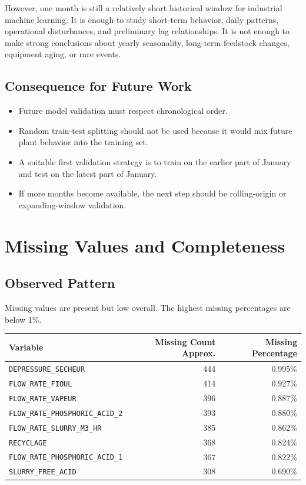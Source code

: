 \documentclass[11pt,a4paper]{article}
\begin{document}
However, one month is still a relatively short historical window for industrial machine learning. It is enough to study short-term behavior, daily patterns, operational disturbances, and preliminary lag relationships. It is not enough to make strong conclusions about yearly seasonality, long-term feedstock changes, equipment aging, or rare events.

\subsection{Consequence for Future Work}

\begin{itemize}
    \item Future model validation must respect chronological order.
    \item Random train-test splitting should not be used because it would mix future plant behavior into the training set.
    \item A suitable first validation strategy is to train on the earlier part of January and test on the latest part of January.
    \item If more months become available, the next step should be rolling-origin or expanding-window validation.
\end{itemize}

\section{Missing Values and Completeness}

\subsection{Observed Pattern}

Missing values are present but low overall. The highest missing percentages are below 1\%.

\begin{longtable}{p{8cm}rr}
\toprule
Variable & Missing Count Approx. & Missing Percentage \\
\midrule
\texttt{DEPRESSURE\_SECHEUR} & 444 & 0.995\% \\
\texttt{FLOW\_RATE\_FIOUL} & 414 & 0.927\% \\
\texttt{FLOW\_RATE\_VAPEUR} & 396 & 0.887\% \\
\texttt{FLOW\_RATE\_PHOSPHORIC\_ACID\_2} & 393 & 0.880\% \\
\texttt{FLOW\_RATE\_SLURRY\_M3\_HR} & 385 & 0.862\% \\
\texttt{RECYCLAGE} & 368 & 0.824\% \\
\texttt{FLOW\_RATE\_PHOSPHORIC\_ACID\_1} & 367 & 0.822\% \\
\texttt{SLURRY\_FREE\_ACID} & 308 & 0.690\% \\
\bottomrule
\end{longtable}
\end{document}
